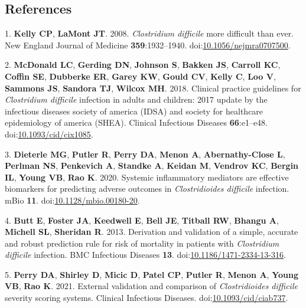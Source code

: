 \documentclass[
  12pt,
]{article}
\newenvironment{cslreferences}%
  {}%
  {\par}
\begin{document}
\newpage

\hypertarget{references}{%
\subsection{References}\label{references}}

\hypertarget{refs}{}
\begin{cslreferences}
\leavevmode\hypertarget{ref-Kelly2008}{}%
1. \textbf{Kelly CP}, \textbf{LaMont JT}. 2008. \emph{Clostridium
difficile} more difficult than ever. New England Journal of Medicine
\textbf{359}:1932--1940.
doi:\href{https://doi.org/10.1056/nejmra0707500}{10.1056/nejmra0707500}.

\leavevmode\hypertarget{ref-McDonald2018}{}%
2. \textbf{McDonald LC}, \textbf{Gerding DN}, \textbf{Johnson S},
\textbf{Bakken JS}, \textbf{Carroll KC}, \textbf{Coffin SE},
\textbf{Dubberke ER}, \textbf{Garey KW}, \textbf{Gould CV},
\textbf{Kelly C}, \textbf{Loo V}, \textbf{Sammons JS}, \textbf{Sandora
TJ}, \textbf{Wilcox MH}. 2018. Clinical practice guidelines for
\emph{Clostridium difficile} infection in adults and children: 2017
update by the infectious diseases society of america (IDSA) and society
for healthcare epidemiology of america (SHEA). Clinical Infectious
Diseases \textbf{66}:e1--e48.
doi:\href{https://doi.org/10.1093/cid/cix1085}{10.1093/cid/cix1085}.

\leavevmode\hypertarget{ref-Dieterle2020}{}%
3. \textbf{Dieterle MG}, \textbf{Putler R}, \textbf{Perry DA},
\textbf{Menon A}, \textbf{Abernathy-Close L}, \textbf{Perlman NS},
\textbf{Penkevich A}, \textbf{Standke A}, \textbf{Keidan M},
\textbf{Vendrov KC}, \textbf{Bergin IL}, \textbf{Young VB}, \textbf{Rao
K}. 2020. Systemic inflammatory mediators are effective biomarkers for
predicting adverse outcomes in \emph{Clostridioides difficile}
infection. mBio \textbf{11}.
doi:\href{https://doi.org/10.1128/mbio.00180-20}{10.1128/mbio.00180-20}.

\leavevmode\hypertarget{ref-Butt2013}{}%
4. \textbf{Butt E}, \textbf{Foster JA}, \textbf{Keedwell E},
\textbf{Bell JE}, \textbf{Titball RW}, \textbf{Bhangu A},
\textbf{Michell SL}, \textbf{Sheridan R}. 2013. Derivation and
validation of a simple, accurate and robust prediction rule for risk of
mortality in patients with \emph{Clostridium difficile} infection. BMC
Infectious Diseases \textbf{13}.
doi:\href{https://doi.org/10.1186/1471-2334-13-316}{10.1186/1471-2334-13-316}.

\leavevmode\hypertarget{ref-Perry2021}{}%
5. \textbf{Perry DA}, \textbf{Shirley D}, \textbf{Micic D},
\textbf{Patel CP}, \textbf{Putler R}, \textbf{Menon A}, \textbf{Young
VB}, \textbf{Rao K}. 2021. External validation and comparison of
\emph{Clostridioides difficile} severity scoring systems. Clinical
Infectious Diseases.
doi:\href{https://doi.org/10.1093/cid/ciab737}{10.1093/cid/ciab737}.


\end{cslreferences}
\end{document}

